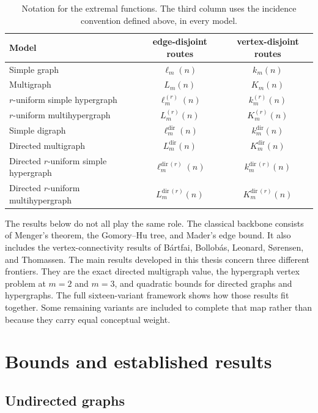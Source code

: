 \begin{table}[ht]
\centering
\caption{Notation for the extremal functions. The third column uses the
incidence convention defined above, in every model.}
\label{tab:notation}
\begin{tabular}{l|c|c}
\toprule
Model & edge-disjoint routes & vertex-disjoint routes \\
\midrule
Simple graph & $\ell_m(n)$ & $k_m(n)$ \\
Multigraph & $L_m(n)$ & $K_m(n)$ \\
$r$-uniform simple hypergraph & $\ell_m^{(r)}(n)$ & $k_m^{(r)}(n)$ \\
$r$-uniform multihypergraph & $L_m^{(r)}(n)$ & $K_m^{(r)}(n)$ \\
Simple digraph & $\ell_m^{\mathrm{dir}}(n)$ & $k_m^{\mathrm{dir}}(n)$ \\
Directed multigraph & $L_m^{\mathrm{dir}}(n)$ & $K_m^{\mathrm{dir}}(n)$ \\
Directed $r$-uniform simple hypergraph & $\ell_m^{\mathrm{dir}\,(r)}(n)$ & $k_m^{\mathrm{dir}\,(r)}(n)$ \\
Directed $r$-uniform multihypergraph & $L_m^{\mathrm{dir}\,(r)}(n)$ & $K_m^{\mathrm{dir}\,(r)}(n)$ \\
\bottomrule
\end{tabular}
\end{table}

The results below do not all play the same role.
The classical backbone consists of Menger's theorem, the Gomory--Hu tree, and Mader's edge bound.
It also includes the vertex-connectivity results of B\'{a}rtfai, Bollob\'{a}s, Leonard, S{\o}rensen, and Thomassen.
The main results developed in this thesis concern three different frontiers.
They are the exact directed multigraph value, the hypergraph vertex problem at $m=2$ and $m=3$, and quadratic bounds for directed graphs and hypergraphs.
The full sixteen-variant framework shows how those results fit together.
Some remaining variants are included to complete that map rather than because they carry equal conceptual weight.

\section{Bounds and established results}

\subsection{Undirected graphs}

